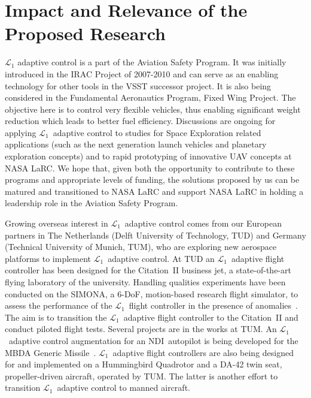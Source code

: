 \documentclass[letter,onecolumn,12pt]{aiaa-tc}
\newcommand{\Lone}{\mathcal{L}_1}
\begin{document}
\section{Impact and Relevance of the Proposed Research}

$\Lone$ adaptive control is a part of the Aviation Safety Program. It was initially introduced in the IRAC Project of 2007-2010 and can serve as an enabling technology for other tools in the VSST successor project. It is also being considered in the Fundamental Aeronautics Program, Fixed Wing Project. The objective here is to control very flexible vehicles, thus enabling significant weight reduction which leads to better fuel efficiency. Discussions are ongoing for applying $\Lone$~adaptive control to studies for Space Exploration related applications (such as the next generation launch vehicles and planetary exploration concepts) and to rapid prototyping of innovative UAV concepts at NASA LaRC. We hope that, given both the opportunity to contribute to these programs and appropriate levels of funding, the solutions proposed by us can be matured and transitioned to NASA LaRC and support NASA LaRC in holding a leadership role in the Aviation Safety Program.

Growing overseas interest in $\Lone$~adaptive control comes from our European partners in The Netherlands (Delft University of Technology, TUD) and Germany (Technical University of Munich, TUM), who are exploring new aerospace platforms to implement $\Lone$~adaptive control. At TUD an $\Lone$~adaptive flight controller has been designed for the Citation~II business jet, a state-of-the-art flying laboratory of the university. Handling qualities experiments have been conducted on the SIMONA, a 6-DoF, motion-based research flight simulator, to assess the performance of the $\Lone$~flight controller in the presence of anomalies~\cite{GNC11_L1Citation}. The aim is to transition the $\Lone$~adaptive flight controller to the Citation~II and conduct piloted flight tests. Several projects are in the works at TUM. An $\Lone$~adaptive control augmentation for an NDI~autopilot is being developed for the MBDA Generic Missile~\cite{GNC12_L1missileTUM}. $\Lone$~adaptive flight controllers are also being designed for and implemented on a Hummingbird Quadrotor and a DA-42 twin seat, propeller-driven aircraft, operated by TUM. The latter is another effort to transition $\Lone$~adaptive control to manned aircraft.
\end{document}
